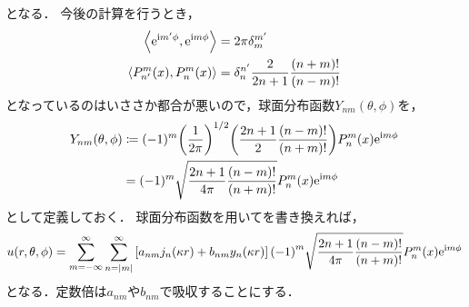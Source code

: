 \documentclass{report}
\begin{document}
    となる．
    今後の計算を行うとき，
    \begin{align}
      \left\langle \mathrm{e}^{\mathrm{i} m'\phi}, \mathrm{e}^{\mathrm{i} m\phi} \right\rangle &= 2\pi\delta_m^{m'} \\ 
      \left\langle P_{n'}^m(x), P_n^m(x) \right\rangle &= \delta_{n}^{n'}\frac{2}{2n + 1}\frac{(n + m)!}{(n - m)!}
    \end{align}
    となっているのはいささか都合が悪いので，球面分布函数$Y_{nm}(\theta, \phi)$を，
    \begin{align}
      Y_{nm}(\theta, \phi) &\coloneqq (-1)^m\qty(\frac{1}{2\pi})^{1/2}\qty(\frac{2n + 1}{2}\frac{(n - m)!}{(n + m)!})P_n^m(x)\mathrm{e}^{\mathrm{i} m\phi} \\ 
      &= (-1)^m\sqrt{\frac{2n + 1}{4\pi}\frac{(n - m)!}{(n + m)!}}P_n^m(x)\mathrm{e}^{\mathrm{i} m\phi}
    \end{align}
    として定義しておく．
    球面分布函数を用いてを書き換えれば，
    \begin{align}
      u(r, \theta, \phi) = \sum_{m = -\infty}^{\infty}\sum_{n = \abs{m}}^{\infty}\qty[a_{nm}j_n(\kappa r) + b_{nm}y_n(\kappa r)](-1)^m\sqrt{\frac{2n + 1}{4\pi}\frac{(n - m)!}{(n + m)!}}P_n^m(x)\mathrm{e}^{\mathrm{i} m\phi} \label{u-expand-form2}
    \end{align}
    となる．定数倍は$a_{nm}$や$b_{nm}$で吸収することにする．
\end{document}
